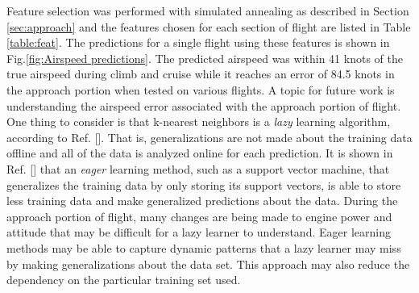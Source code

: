 \documentclass[]{aiaa-tc}
\begin{document}
Feature selection was performed with simulated annealing as described in Section \ref{sec:approach} and the features chosen for each section of flight are listed in Table \ref{table:feat}. The predictions for a single flight using these features is shown in Fig.\ref{fig:Airspeed predictions}. The predicted airspeed was within 41 knots of the true airspeed during climb and cruise while it reaches an error of 84.5 knots in the approach portion when tested on various flights. A topic for future work is understanding the airspeed error associated with the approach portion of flight. One thing to consider is that k-nearest neighbors is a {\em lazy} learning algorithm, according to Ref. []. That is, generalizations are not made about the training data offline and all of the data is analyzed online for each prediction. It is shown in Ref. [] that an {\em eager} learning method, such as a support vector machine, that generalizes the training data by only storing its support vectors, is able to store less training data and make generalized predictions about the data. During the approach portion of flight, many changes are being made to engine power and attitude that may be difficult for a lazy learner to understand. Eager learning methods may be able to capture dynamic patterns that a lazy learner may miss by making generalizations about the data set. This approach may also reduce the dependency on the particular training set used.
\end{document}
